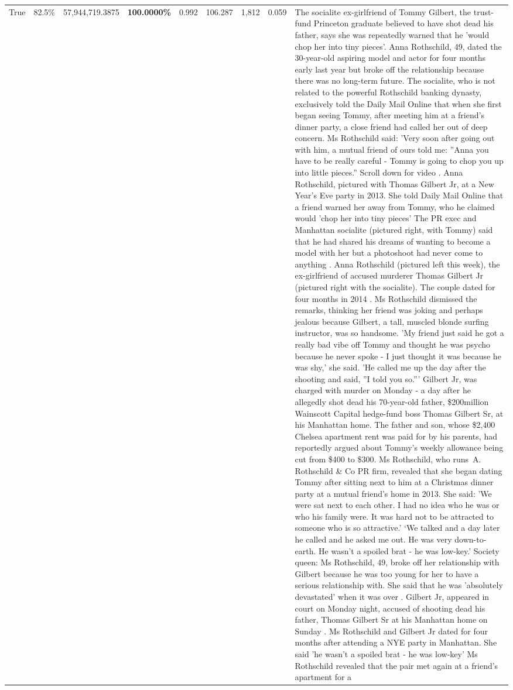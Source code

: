 \begin{table}[H]
\begin{tabular}{lllrlllll}
True & 82.5\% & 57,944,719.3875 & \bfseries \color{red} 100.0000\% & 0.992 & 106.287 & 1,812 & 0.059 & The socialite ex-girlfriend of Tommy Gilbert, the trust-fund Princeton graduate believed to have shot dead his father, says she was repeatedly warned that he 'would chop her into tiny pieces'. Anna Rothschild, 49, dated the 30-year-old aspiring model and actor for four months early last year but broke off the relationship because there was no long-term future. The socialite, who is not related to the powerful Rothschild banking dynasty, exclusively told the Daily Mail Online that when she first began seeing Tommy, after meeting him at a friend's dinner party, a close friend had called her out of deep concern. Ms Rothschild said: 'Very soon after going out with him, a mutual friend of ours told me: ''Anna you have to be really careful - Tommy is going to chop you up into little pieces.'' Scroll down for video . Anna Rothschild, pictured with Thomas Gilbert Jr, at a New Year's Eve party in 2013. She told Daily Mail Online that a friend warned her away from Tommy, who he claimed would 'chop her into tiny pieces' The PR exec and Manhattan socialite (pictured right, with Tommy) said that he had shared his dreams of wanting to become a model with her but a photoshoot had never come to anything . Anna Rothschild (pictured left this week), the ex-girlfriend of accused murderer Thomas Gilbert Jr (pictured right with the socialite). The couple dated for four months in 2014 . Ms Rothschild dismissed the remarks, thinking her friend was joking and perhaps jealous because Gilbert, a tall, muscled blonde surfing instructor, was so handsome. 'My friend just said he got a really bad vibe off Tommy and thought he was psycho because he never spoke - I just thought it was because he was shy,' she said. 'He called me up the day after the shooting and said, ''I told you so.''' Gilbert Jr, was charged with murder on Monday - a day after he allegedly shot dead his 70-year-old father, \$200million Wainscott Capital hedge-fund boss Thomas Gilbert Sr, at his Manhattan home. The father and son, whose \$2,400 Chelsea apartment rent was paid for by his parents, had reportedly argued about Tommy's weekly allowance being cut from \$400 to \$300. Ms Rothschild, who runs A. Rothschild \& Co PR firm, revealed that she began dating Tommy after sitting next to him at a Christmas dinner party at a mutual friend's home in 2013. She said: 'We were sat next to each other. I had no idea who he was or who his family were. It was hard not to be attracted to someone who is so attractive.' ‘We talked and a day later he called and he asked me out. He was very down-to-earth. He wasn’t a spoiled brat - he was low-key.’ Society queen: Ms Rothschild, 49, broke off her relationship with Gilbert because he was too young for her to have a serious relationship with. She said that he was 'absolutely devastated' when it was over . Gilbert Jr, appeared in court on Monday night, accused of shooting dead his father, Thomas Gilbert Sr at his Manhattan home on Sunday . Ms Rothschild and Gilbert Jr dated for four months after attending a NYE party in Manhattan. She said 'he wasn't a spoiled brat - he was low-key' Ms Rothschild revealed that the pair met again at a friend’s apartment for a 
\end{tabular}
\end{table}
